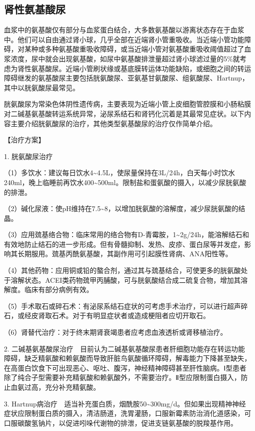 \subsection{肾性氨基酸尿}

血浆中的氨基酸仅有部分与血浆蛋白结合，大多数氨基酸以游离状态存在于血浆中。他们可以自由通过肾小球，几乎全部在近端肾小管重吸收。当近端小管功能障碍，对某种或多种氨基酸重吸收障碍，或当近端小管对氨基酸重吸收阈值超过了血浆浓度，尿中就会出现氨基酸，如尿中氨基酸排泄量超过肾小球滤过量的5\%就考虑为肾性氨基酸尿。近端小管刷状缘或基底膜转运体功能缺陷，或细胞之间的转运障碍继发的氨基酸尿主要包括胱氨酸尿、亚氨基甘氨酸尿、组氨酸尿、Hartnup，其中以胱氨酸尿最常见。

胱氨酸尿为常染色体阴性遗传病，主要表现为近端小管上皮细胞管腔膜和小肠粘膜对二碱基氨基酸转运系统异常，泌尿系结石和肾钙化沉着是其最常见症状。以下内容主要介绍胱氨酸尿的治疗，其他类型氨基酸尿的治疗仅作简单介绍。

【治疗方案】

1. 胱氨酸尿治疗

（1）多饮水：建议每日饮水4\textasciitilde{}4.5L，使尿量保持在3L/24h，白天每小时饮水240ml，晚上临睡前再饮水400\textasciitilde{}500ml。限制盐和蛋氨酸的摄入，以减少尿胱氨酸的排泄。

（2）碱化尿液：使pH维持在7.5\textasciitilde{}8，以增加胱氨酸的溶解度，减少尿胱氨酸的结晶。

（3）应用巯基络合物：临床常用的络合物有D-青霉胺，1\textasciitilde{}2g/24h，能溶解结石和有效地防止结石的进一步形成。但有骨髓抑制、发热、皮疹、蛋白尿等并发症，影响其长期服用。巯基丙酰氨基酸，其副作用可引起膜性肾病、ANA阳性等。

（4）其他药物：应用铜或铅的螯合剂，通过其与巯基结合，可使更多的胱氨酸处于溶解状态。ACEI类药物巯甲丙脯酸，可与胱氨酸结合成二硫复合物，增加其溶解度。临床有部分病例有效。

（5）手术取石或碎石术：有泌尿系结石症状的可考虑手术治疗，可以进行超声碎石，或经皮肾取石术。对于有明显症状者或造成梗阻者应切开取石。

（6）肾替代治疗：对于终末期肾衰竭患者应考虑血液透析或肾移植治疗。

2.
二碱基氨基酸尿治疗　目前认为二碱基氨基酸尿患者肝细胞功能存在转运功能障碍，缺乏精氨酸和赖氨酸而导致肝脏鸟氨酸循环障碍，解毒能力下降甚至缺失，在高蛋白饮食下可出现恶心、呕吐、腹泻，神经精神障碍甚至肝性脑病。Ⅰ型患者除了纯合子型需要补充精氨酸和赖氨酸外，不需要治疗。Ⅱ型应限制蛋白摄入，防止血氨过高，充分补充精氨酸。

3.
Hartnup病治疗　适当补充蛋白质，烟酰胺50\textasciitilde{}300mg/d。但如果出现精神神经症状应限制蛋白质的摄入，清洁肠道，洗胃灌肠，口服新霉素防治消化道感染，可口服碳酸氢钠片，以促进吲哚代谢物的排泄，促进支链氨基酸的脱羧基作用。


